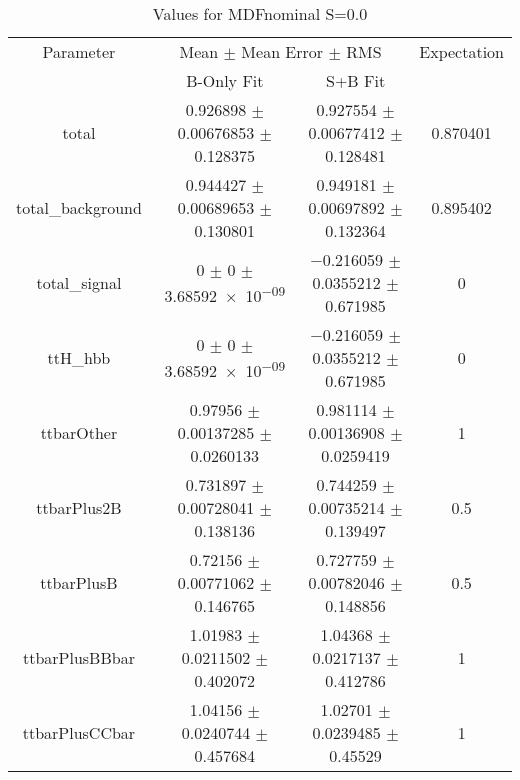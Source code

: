 \begin{table}
\centering
\caption{Values for MDFnominal S=0.0}
\begin{tabular}{cccc}
\toprule
Parameter & \multicolumn{2}{c}{Mean $\pm$ Mean Error $\pm$ RMS} & Expectation\\
 & B-Only Fit & S+B Fit & \\
\midrule
total & \num{0.926898} $\pm$ \num{0.00676853} $\pm$ \num{0.128375} & \num{0.927554} $\pm$ \num{0.00677412} $\pm$ \num{0.128481} & \num{0.870401}\\
total\_background & \num{0.944427} $\pm$ \num{0.00689653} $\pm$ \num{0.130801} & \num{0.949181} $\pm$ \num{0.00697892} $\pm$ \num{0.132364} & \num{0.895402}\\
total\_signal & \num{0} $\pm$ \num{0} $\pm$ \num{3.68592e-09} & \num{-0.216059} $\pm$ \num{0.0355212} $\pm$ \num{0.671985} & \num{0}\\
ttH\_hbb & \num{0} $\pm$ \num{0} $\pm$ \num{3.68592e-09} & \num{-0.216059} $\pm$ \num{0.0355212} $\pm$ \num{0.671985} & \num{0}\\
ttbarOther & \num{0.97956} $\pm$ \num{0.00137285} $\pm$ \num{0.0260133} & \num{0.981114} $\pm$ \num{0.00136908} $\pm$ \num{0.0259419} & \num{1}\\
ttbarPlus2B & \num{0.731897} $\pm$ \num{0.00728041} $\pm$ \num{0.138136} & \num{0.744259} $\pm$ \num{0.00735214} $\pm$ \num{0.139497} & \num{0.5}\\
ttbarPlusB & \num{0.72156} $\pm$ \num{0.00771062} $\pm$ \num{0.146765} & \num{0.727759} $\pm$ \num{0.00782046} $\pm$ \num{0.148856} & \num{0.5}\\
ttbarPlusBBbar & \num{1.01983} $\pm$ \num{0.0211502} $\pm$ \num{0.402072} & \num{1.04368} $\pm$ \num{0.0217137} $\pm$ \num{0.412786} & \num{1}\\
ttbarPlusCCbar & \num{1.04156} $\pm$ \num{0.0240744} $\pm$ \num{0.457684} & \num{1.02701} $\pm$ \num{0.0239485} $\pm$ \num{0.45529} & \num{1}\\
\bottomrule
\end{tabular}
\end{table}